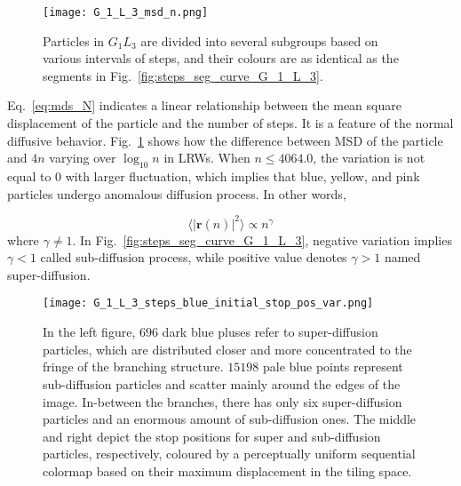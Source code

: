       
      \begin{figure}
         \centering
         \texttt{[image: G\_1\_L\_3\_msd\_n.png]}
         \caption{Particles in $G_1L_3$ are divided into several
           subgroups based on various intervals of steps, and their
           colours are as identical as the segments in
           Fig.~\ref{fig:steps_seg_curve_G_1_L_3}.}
         \label{fig:G_1_L_3_msd_n}
      \end{figure}


     Eq.~\ref{eq:mds_N} indicates a linear relationship between the
     mean square displacement of the particle and the number of
     steps. It is a feature of the normal diffusive
     behavior. Fig.~\ref{fig:G_1_L_3_msd_n} shows how the difference
     between MSD of the particle and $4n$ varying over $\log_{10}n$ in
     LRWs. When $n \leq 4064.0$, the variation is not
     equal to $0$ with larger fluctuation, which implies that blue,
     yellow, and pink particles undergo anomalous diffusion
     process. In other words,

     \begin{equation}\label{eq:anomalous_diffusion}
       \langle \lvert \bm{r}(n) \lvert^2 \rangle \propto n^{\gamma}
     \end{equation}
     where $\gamma \ne 1$. In Fig.~\ref{fig:steps_seg_curve_G_1_L_3},
     negative variation implies $\gamma < 1$ called sub-diffusion
     process, while positive value denotes $\gamma > 1$ named
     super-diffusion.

     
      \begin{figure}
         \centering
         \texttt{[image: G\_1\_L\_3\_steps\_blue\_initial\_stop\_pos\_var.png]}
         \caption{In the left figure, $696$ dark blue pluses refer to
           super-diffusion particles, which are distributed closer and
           more concentrated to the fringe of the branching
           structure. $15198$ pale blue points represent sub-diffusion
           particles and scatter mainly around the edges of the
           image. In-between the branches, there has only six
           super-diffusion particles and an enormous amount of
           sub-diffusion ones. The middle and right depict the stop
           positions for super and sub-diffusion particles,
           respectively, coloured by a perceptually uniform sequential
           colormap based on their maximum displacement in the tiling
           space.}
         \label{fig:G_1_L_3_var_initial_stop_pos}
      \end{figure}

